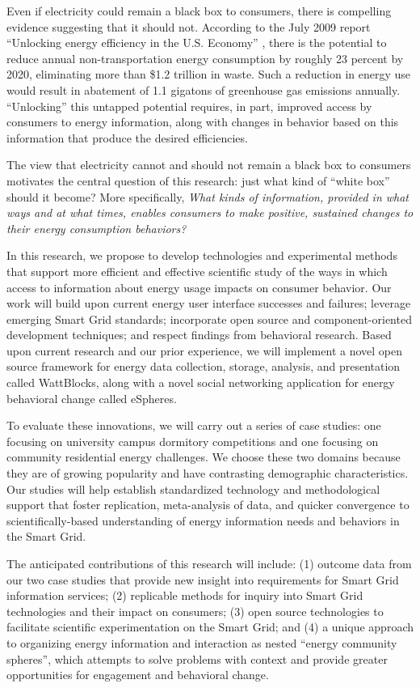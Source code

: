 Even if electricity could remain a black box to consumers, there is
compelling evidence suggesting that it should not.  According to the July
2009 report ``Unlocking energy efficiency in the U.S. Economy''
\cite{Granade09}, there is the potential to reduce annual
non-transportation energy consumption by roughly 23 percent by 2020,
eliminating more than \$1.2 trillion in waste.  Such a reduction in energy
use would result in abatement of 1.1 gigatons of greenhouse gas emissions
annually. ``Unlocking'' this untapped potential requires, in part, improved
access by consumers to energy information, along with changes in behavior
based on this information that produce the desired efficiencies.

The view that electricity cannot and should not remain a black box to
consumers motivates the central question of this research: just what kind of
``white box'' should it become?  More specifically, {\em What kinds of
  information, provided in what ways and at what times, enables consumers
  to make positive, sustained changes to their energy consumption
  behaviors?}

In this research, we propose to develop technologies and experimental
methods that support more efficient and effective scientific study of the
ways in which access to information about energy usage impacts on consumer
behavior.  Our work will build upon current energy user interface successes
and failures; leverage emerging Smart Grid standards; incorporate open
source and component-oriented development techniques; and respect findings
from behavioral research. Based upon current research and our prior
experience, we will implement a novel open source framework for energy data
collection, storage, analysis, and presentation called WattBlocks, along
with a novel social networking application for energy behavioral change
called eSpheres.  

To evaluate these innovations, we will carry out a series of case studies:
one focusing on university campus dormitory competitions and one focusing
on community residential energy challenges. We choose these two domains
because they are of growing popularity and have contrasting demographic
characteristics.  Our studies will help establish standardized technology
and methodological support that foster replication, meta-analysis of data,
and quicker convergence to scientifically-based understanding of energy
information needs and behaviors in the Smart Grid.

The anticipated contributions of this research will include: (1) outcome
data from our two case studies that provide new insight into requirements
for Smart Grid information services; (2) replicable methods for inquiry
into Smart Grid technologies and their impact on consumers; (3) open
source technologies to facilitate scientific experimentation on the Smart
Grid; and (4) a unique approach to organizing energy information and
interaction as nested ``energy community spheres'', which attempts to solve
problems with context and provide greater opportunities for engagement and
behavioral change.

